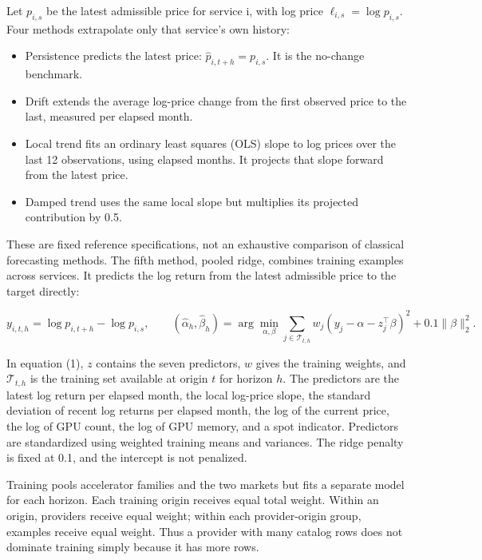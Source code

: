 \documentclass[10pt]{article}
\begin{document}
Let $p_{i,s}$ be the latest admissible price for service i, with log price $\ell_{i,s}=\log p_{i,s}$. Four methods extrapolate only that service's own history:

\begin{itemize}
\setlength{\itemsep}{2pt}
\item Persistence predicts the latest price: $\widehat p_{i,t+h}=p_{i,s}$. It is the no-change benchmark.
\item Drift extends the average log-price change from the first observed price to the last, measured per elapsed month.
\item Local trend fits an ordinary least squares (OLS) slope to log prices over the last 12 observations, using elapsed months. It projects that slope forward from the latest price.
\item Damped trend uses the same local slope but multiplies its projected contribution by 0.5.
\end{itemize}

These are fixed reference specifications, not an exhaustive comparison of classical forecasting methods. The fifth method, pooled ridge, combines training examples across services. It predicts the log return from the latest admissible price to the target directly:

\begin{equation}
 y_{i,t,h}=\log p_{i,t+h}-\log p_{i,s},\qquad
 (\widehat\alpha_h,\widehat\beta_h)=\arg\min_{\alpha,\beta}
 \sum_{j\in\mathcal T_{t,h}} w_j(y_j-\alpha-z_j^\top\beta)^2+0.1\|\beta\|_2^2.
\end{equation}

In equation (1), $z$ contains the seven predictors, $w$ gives the training weights, and $\mathcal T_{t,h}$ is the training set available at origin $t$ for horizon $h$. The predictors are the latest log return per elapsed month, the local log-price slope, the standard deviation of recent log returns per elapsed month, the log of the current price, the log of GPU count, the log of GPU memory, and a spot indicator. Predictors are standardized using weighted training means and variances. The ridge penalty is fixed at 0.1, and the intercept is not penalized.

Training pools accelerator families and the two markets but fits a separate model for each horizon. Each training origin receives equal total weight. Within an origin, providers receive equal weight; within each provider-origin group, examples receive equal weight. Thus a provider with many catalog rows does not dominate training simply because it has more rows.
\end{document}
